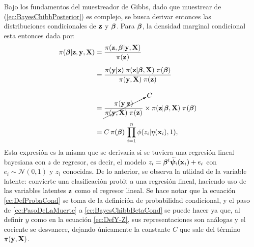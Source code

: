 \documentclass[../Main/Main.tex]{subfiles}
\begin{document}
Bajo los fundamentos del muestreador de Gibbs, dado que muestrear de (\ref{ec:BayesChibbPosterior}) es complejo, se busca derivar entonces las distribuciones condicionales de $\mathbf{z}$ y $\bm{\beta}$. Para $\bm{\beta}$, la densidad marginal condicional esta entonces dada por:
\begin{align}
	\pi(\bm{\beta}|\mathbf{z},\mathbf{y},\mathbf{X})
	& = \dfrac{\pi(\mathbf{z}, \bm{\beta}| \mathbf{y}, \mathbf{X})}{\pi(\mathbf{z})} 
	\label{ec:DefProbaCond}\\[5pt]
	& = \dfrac{\pi(\mathbf{y} | \mathbf{z})\;\pi(\mathbf{z}|\bm{\beta},\mathbf{X}) 
	\; \pi(\bm{\beta})}{\pi(\mathbf{y}, \mathbf{X}) \; \pi(\mathbf{z})} \nonumber \\[10pt]
	& = \cancelto{C}{\dfrac{\pi(\mathbf{y} | \mathbf{z})}{\pi(\mathbf{y}, \mathbf{X}) \; \pi(\mathbf{z})}} \times \pi(\mathbf{z}|\bm{\beta},\mathbf{X}) \; \pi(\bm{\beta}) \label{ec:PasoDeLaMuerte} \\[5pt]
	& = C \,\pi(\bm{\beta}) \, \prod_{i = 1}^n\phi(z_i|\eta(\mathbf{x}_i),1), \label{ec:BayesChibbBetaCond}
\end{align}
Esta expresión es la misma que se derivaría si se tuviera una regresión lineal bayesiana con $z$ de regresor, es decir, el modelo $z_i = \bm{\beta}^t\widetilde{\bm{\psi}}_i(\mathbf{x}_i) + e_i$ con $e_i \sim \mathcal{N}(0,1)$ y $z_i$ conocidas. De lo anterior, se observa la utlidad de la variable latente: convierte una clasificación probit a una regresión lineal, haciendo uso de las variables latentes $\mathbf{z}$ como el regresor lineal. Se hace notar que la ecuación \eqref{ec:DefProbaCond} se toma de la definición de probabilidad condicional, y el paso de \eqref{ec:PasoDeLaMuerte} a \eqref{ec:BayesChibbBetaCond} se puede hacer ya que, al definir $y$ como en la ecuación \eqref{ec:DefY-Z}, sus representaciones son análogas y el cociente se desvanece, dejando únicamente la constante $C$ que sale del término $\pi(\mathbf{y}, \mathbf{X})$. %
\end{document}
